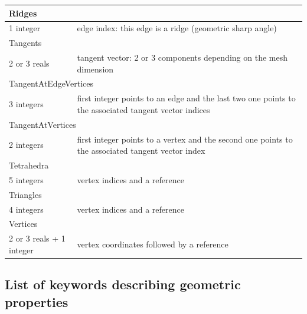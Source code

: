 \documentclass[a4paper,12pt]{article}
\begin{document}
\begin{longtable}{|m{4cm}|m{11cm}|}
\multicolumn{2}{|l|}{Ridges} \\
\hline
1 integer & edge index: this edge is a ridge (geometric sharp angle) \\
\hline\hline

\multicolumn{2}{|l|}{Tangents} \\
\hline
2 or 3 reals & tangent vector: 2 or 3 components depending on the mesh dimension \\
\hline\hline

\multicolumn{2}{|l|}{TangentAtEdgeVertices} \\
\hline
3 integers & first integer points to an edge and the last two one points to the associated tangent vector indices \\
\hline\hline

\multicolumn{2}{|l|}{TangentAtVertices} \\
\hline
2 integers & first integer points to a vertex and the second one points to the associated tangent vector index \\
\hline

\multicolumn{2}{|l|}{Tetrahedra} \\
\hline
5 integers & vertex indices and a reference \\
\hline\hline

\multicolumn{2}{|l|}{Triangles} \\
\hline
4 integers & vertex indices and a reference \\
\hline\hline

\multicolumn{2}{|l|}{Vertices} \\
\hline
2 or 3 reals + 1 integer & vertex coordinates followed by a reference \\
\hline

\end{longtable}


\subsection{List of keywords describing geometric properties}
\end{document}
